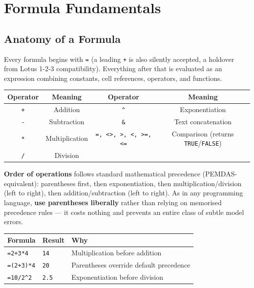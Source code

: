 \documentclass[11pt,a4paper]{article}
\begin{document}
\section{Formula Fundamentals}
\label{sec:formula-fund}

\subsection{Anatomy of a Formula}

Every formula begins with \texttt{=} (a leading \texttt{+} is also silently accepted, a holdover from Lotus 1-2-3 compatibility). Everything after that is evaluated as an expression combining constants, cell references, operators, and functions.

\begin{formulasyntax}
\begin{center}
\begin{tabular}{@{}cccc@{}}
\toprule
\textbf{Operator} & \textbf{Meaning} & \textbf{Operator} & \textbf{Meaning}\\
\midrule
\texttt{+} & Addition & \texttt{\^{}} & Exponentiation \\
\texttt{-} & Subtraction & \texttt{\&} & Text concatenation \\
\texttt{*} & Multiplication & \texttt{=, <>, >, <, >=, <=} & Comparison (returns \texttt{TRUE}/\texttt{FALSE}) \\
\texttt{/} & Division & & \\
\bottomrule
\end{tabular}
\end{center}
\end{formulasyntax}

\textbf{Order of operations} follows standard mathematical precedence (PEMDAS-equivalent): parentheses first, then exponentiation, then multiplication/division (left to right), then addition/subtraction (left to right). As in any programming language, \textbf{use parentheses liberally} rather than relying on memorised precedence rules --- it costs nothing and prevents an entire class of subtle model errors.

\begin{center}
\begin{tabular}{@{}p{4.2cm}p{2.4cm}p{5.8cm}@{}}
\toprule
\textbf{Formula} & \textbf{Result} & \textbf{Why} \\
\midrule
\texttt{=2+3*4} & \texttt{14} & Multiplication before addition \\
\texttt{=(2+3)*4} & \texttt{20} & Parentheses override default precedence \\
\texttt{=10/2\^{}2} & \texttt{2.5} & Exponentiation before division \\
\bottomrule
\end{tabular}
\end{center}
\end{document}
